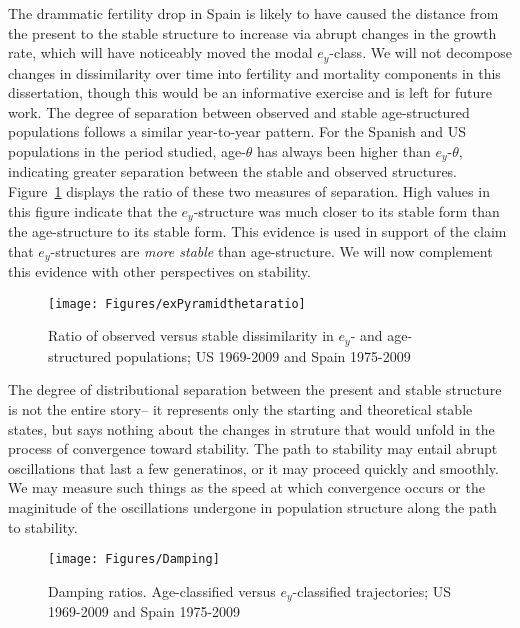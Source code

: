 The drammatic fertility drop in Spain is likely to have caused the distance
from the present to the stable structure to increase via abrupt changes in the
growth rate, which will have noticeably moved the modal $e_y$-class. We
will not decompose changes in dissimilarity over time into fertility and
mortality components in this dissertation, though this would be an informative
exercise and is left for future work. The degree of separation
between observed and stable age-structured populations follows a similar
year-to-year pattern. For the Spanish and US populations in the period studied,
age-$\theta$ has always been higher than $e_y$-$\theta$, indicating greater
separation between the stable and observed structures.
Figure~\ref{fig:exPyramidthetaratio} displays the ratio of these two measures 
of separation. High values in this figure indicate that the $e_y$-structure was
 much closer to its stable form than the age-structure to its stable form. This
evidence is used in support of the claim that $e_y$-structures are \textit{more
stable} than age-structure. We will now complement this evidence with other
perspectives on stability.

\begin{figure}[ht!]
       \centering
       \caption{Ratio of observed versus stable dissimilarity in $e_y$- and
       age-structured populations; US 1969-2009 and Spain 1975-2009}
        \texttt{[image: Figures/exPyramidthetaratio]}
        \label{fig:exPyramidthetaratio}
\end{figure}

The degree of distributional separation between the present and stable
structure is not the entire story-- it represents only the starting and
theoretical stable states, but says nothing about the changes in struture that
would unfold in the process of convergence toward stability. The path to
stability may entail abrupt oscillations that last a few generatinos, or it may proceed
quickly and smoothly. We may measure such things as the speed at which
convergence occurs or the maginitude of the oscillations undergone in 
population structure along the path to stability. 

\begin{figure}[ht!]
       \centering
       \caption{Damping ratios. Age-classified versus $e_y$-classified
       trajectories; US 1969-2009 and Spain 1975-2009}
        \texttt{[image: Figures/Damping]}
        \label{fig:damping}
\end{figure}

